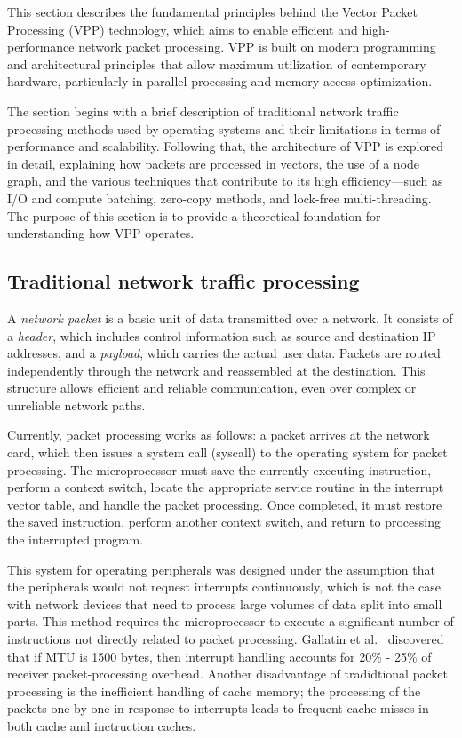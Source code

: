 \begin{chapterabstract}
This section describes the fundamental principles behind the Vector Packet Processing (VPP) technology, which aims to enable efficient and high-performance network packet processing. 
VPP is built on modern programming and architectural principles that allow maximum utilization of contemporary hardware, particularly in parallel processing and memory access optimization.
\end{chapterabstract}

The section begins with a brief description of traditional network traffic processing methods used by operating systems and their limitations in terms of performance and scalability. 
Following that, the architecture of VPP is explored in detail, explaining how packets are processed in vectors, the use of a node graph, 
and the various techniques that contribute to its high efficiency—such as I/O and compute batching, zero-copy methods, and lock-free multi-threading. 
The purpose of this section is to provide a theoretical foundation for understanding how VPP operates.

\subsection{Traditional network traffic processing}
A \textit{network packet} is a basic unit of data transmitted over a network. It consists of a \textit{header}, which includes control information such as source and destination IP addresses, 
and a \textit{payload}, which carries the actual user data. 
Packets are routed independently through the network and reassembled at the destination. 
This structure allows efficient and reliable communication, even over complex or unreliable network paths.

Currently, packet processing works as follows: a packet arrives at the network card, which then
issues a system call (syscall) to the operating system for packet processing. The microprocessor
must save the currently executing instruction, perform a context switch, locate the appropriate
service routine in the interrupt vector table, and handle the packet processing. Once completed, it
must restore the saved instruction, perform another context switch, and return to processing the
interrupted program.

This system for operating peripherals was designed under the assumption that the peripherals
would not request interrupts continuously, which is not the case with network devices that need
to process large volumes of data split into small parts. 
This method requires the microprocessor to execute a significant
number of instructions not directly related to packet processing. 
Gallatin et al.~\cite{gallatin1999trapeze} discovered 
that if MTU is 1500 bytes, then interrupt handling accounts for 20\% - 25\% of receiver packet-processing overhead.
Another disadvantage of tradidtional packet processing is the inefficient handling of cache memory; the processing of the packets one by one in response to
interrupts leads to frequent cache misses in both cache and inctruction caches.~\cite{cox2000profiling} 

